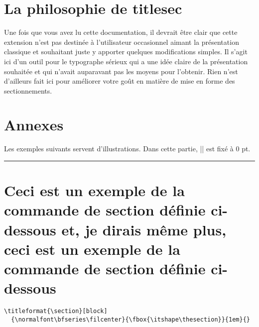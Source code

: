 \documentclass[a4paper]{ltxguide}
\newcommand{\examplesep}{%
  \begin{center}%
    \rule{4pt}{4pt}%
  \end{center}}
\begin{document}
\section{La philosophie de \textsf{titlesec}}

Une fois que vous avez lu cette documentation, il devrait être clair que cette
extension n'est pas destinée à l'utilisateur occasionnel aimant la
présentation classique et souhaitant juste y apporter quelques modifications
simples. Il s'agit ici d'un outil pour le typographe sérieux qui a une idée
claire de la présentation souhaitée et qui n'avait auparavant pas les moyens
pour l'obtenir. Rien n'est d'ailleurs fait ici pour améliorer votre goût en
matière de mise en forme des sectionnements.


\section{Annexes}

Les exemples suivants servent d'illustrations. Dans cette partie, |\parskip|
est fixé à 0 pt.

\begingroup

\setlength{\parskip}{0pt}

\examplesep

\titleformat{\section}[block]
  {\normalfont\bfseries\filcenter}{\fbox{\itshape\thesection}}{1em}{}

\section[Annexes]{Ceci est un exemple de la commande de section définie 
ci-dessous et, je dirais même plus, ceci est un exemple de la commande de
section définie ci-dessous}

\begin{verbatim}
\titleformat{\section}[block]
  {\normalfont\bfseries\filcenter}{\fbox{\itshape\thesection}}{1em}{}
\end{verbatim}
\end{document}

